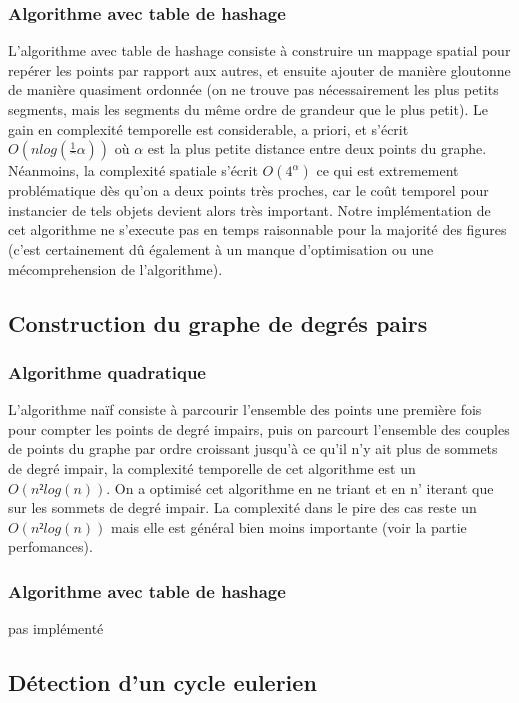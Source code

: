 \documentclass[a4paper,11pt]{article}
\begin{document}
\subsubsection{Algorithme avec table de hashage}

L'algorithme avec table de hashage consiste à construire un mappage spatial pour repérer les points par rapport
aux autres, et ensuite ajouter de manière gloutonne de manière quasiment ordonnée (on ne trouve pas nécessairement
les plus petits segments, mais les segments du même ordre de grandeur que le plus petit). Le gain en complexité temporelle
est considerable, a priori, et s'écrit $O(nlog(\frac{1}^{\alpha}))$ où $\alpha$ est la plus petite distance entre deux points du graphe.
Néanmoins, la complexité spatiale s'écrit $O(4^{\alpha})$ ce qui est extremement problématique dès qu'on a deux points très proches,
car le coût temporel pour instancier de tels objets devient alors très important.
Notre implémentation de cet algorithme ne s'execute pas en temps raisonnable pour la majorité des figures (c'est certainement dû
également à un manque d'optimisation ou une mécomprehension de l'algorithme).
\subsection{Construction du graphe de degrés pairs}

\subsubsection{Algorithme quadratique}

L'algorithme naïf consiste à parcourir l'ensemble des points une première fois pour compter les points de degré impairs,
puis on parcourt l'ensemble des couples de points du graphe par ordre croissant jusqu'à ce qu'il n'y ait plus de sommets de
degré impair, la complexité temporelle de cet algorithme est un $O(n²log(n))$. On a optimisé cet algorithme en ne triant et en n'
iterant que sur les sommets de degré impair. La complexité dans le pire des cas reste un $O(n²log(n))$ mais elle est général bien
moins importante (voir la partie perfomances).

\subsubsection{Algorithme avec table de hashage}

pas implémenté

\subsection{Détection d'un cycle eulerien}
\end{document}
